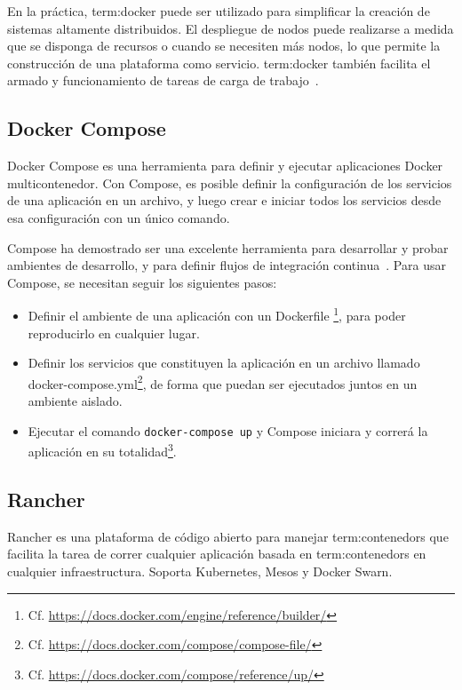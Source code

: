 En la práctica, \gls{term:docker} puede ser utilizado para simplificar la
creación de sistemas altamente distribuidos. El despliegue de nodos puede realizarse a medida que se disponga de recursos o cuando se necesiten más nodos,
lo que permite la construcción de una plataforma como servicio.
\gls{term:docker} también facilita el armado y funcionamiento de tareas de carga
de trabajo~\cite{docker}.

\subsection{Docker Compose}
\label{anexo_compose}

Docker Compose es una herramienta para definir y ejecutar aplicaciones Docker
multicontenedor. Con Compose, es posible definir la configuración de los
servicios de una aplicación en un archivo, y luego crear e iniciar todos los
servicios desde esa configuración con un único comando.

Compose ha demostrado ser una excelente herramienta para desarrollar y probar
ambientes de desarrollo, y para definir flujos de integración
continua~\cite{compose}. Para usar Compose, se necesitan seguir los siguientes
pasos:

\begin{itemize}

  \item
    Definir el ambiente de una aplicación con un Dockerfile
    \footnote{Cf. \url{https://docs.docker.com/engine/reference/builder/}}, para
    poder reproducirlo en cualquier lugar.

  \item
    Definir los servicios que constituyen la aplicación en un archivo llamado
    docker-compose.yml\footnote{Cf. 
    \url{https://docs.docker.com/compose/compose-file/}}, de forma que puedan
    ser ejecutados juntos en un ambiente aislado.

  \item
    Ejecutar el comando \lstinline{docker-compose up} y Compose iniciara y
    correrá la aplicación en su totalidad\footnote{Cf.
    \url{https://docs.docker.com/compose/reference/up/}}.

\end{itemize}

\subsection{Rancher}

Rancher es una plataforma de código abierto para manejar \glspl{term:contenedor}
que facilita la tarea de correr cualquier aplicación basada en
\glspl{term:contenedor} en cualquier infraestructura. Soporta Kubernetes, Mesos
y Docker Swarn.

